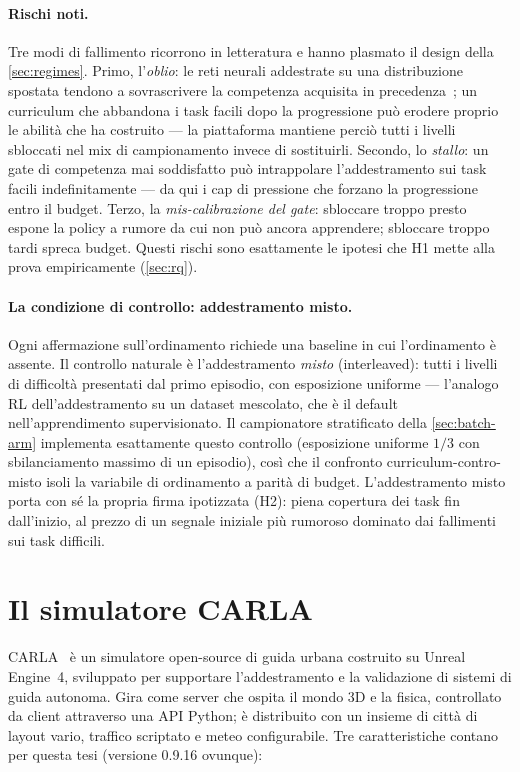 \paragraph{Rischi noti.}
Tre modi di fallimento ricorrono in letteratura e hanno plasmato il
design della \cref{sec:regimes}. Primo, l'\emph{oblio}: le reti neurali
addestrate su una distribuzione spostata tendono a sovrascrivere la
competenza acquisita in precedenza~\cite{french1999catastrophic}; un
curriculum che abbandona i task facili dopo la progressione può erodere
proprio le abilità che ha costruito --- la piattaforma mantiene perciò
tutti i livelli sbloccati nel mix di campionamento invece di
sostituirli. Secondo, lo \emph{stallo}: un gate di competenza mai
soddisfatto può intrappolare l'addestramento sui task facili
indefinitamente --- da qui i cap di pressione che forzano la
progressione entro il budget. Terzo, la \emph{mis-calibrazione del
gate}: sbloccare troppo presto espone la policy a rumore da cui non può
ancora apprendere; sbloccare troppo tardi spreca budget. Questi rischi
sono esattamente le ipotesi che H1 mette alla prova empiricamente
(\cref{sec:rq}).

\paragraph{La condizione di controllo: addestramento misto.}
Ogni affermazione sull'ordinamento richiede una baseline in cui
l'ordinamento è assente. Il controllo naturale è l'addestramento
\emph{misto} (interleaved): tutti i livelli di difficoltà presentati dal
primo episodio, con esposizione uniforme --- l'analogo RL
dell'addestramento su un dataset mescolato, che è il default
nell'apprendimento supervisionato. Il campionatore stratificato della
\cref{sec:batch-arm} implementa esattamente questo controllo
(esposizione uniforme $1/3$ con sbilanciamento massimo di un episodio),
così che il confronto curriculum-contro-misto isoli la variabile di
ordinamento a parità di budget. L'addestramento misto porta con sé la
propria firma ipotizzata (H2): piena copertura dei task fin
dall'inizio, al prezzo di un segnale iniziale più rumoroso dominato dai
fallimenti sui task difficili.

\section{Il simulatore CARLA}
\label{sec:carla-bg}

CARLA~\cite{dosovitskiy2017carla} è un simulatore open-source di guida
urbana costruito su Unreal Engine~4, sviluppato per supportare
l'addestramento e la validazione di sistemi di guida autonoma. Gira come
server che ospita il mondo 3D e la fisica, controllato da client
attraverso una API Python; è distribuito con un insieme di città di
layout vario, traffico scriptato e meteo configurabile. Tre
caratteristiche contano per questa tesi (versione 0.9.16 ovunque):

